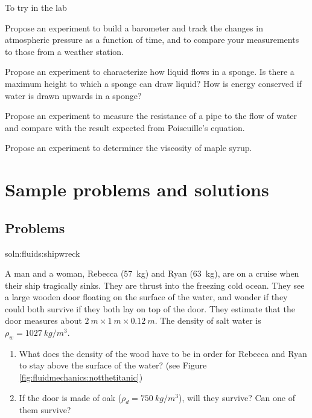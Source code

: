 {{\begin{chapteractivity}{To try in the lab}
{
\item Propose an experiment to build a barometer and track the changes in atmospheric pressure as a function of time, and to compare your measurements to those from a weather station. 
\item Propose an experiment to characterize how liquid flows in a sponge. Is there a maximum height to which a sponge can draw liquid? How is energy conserved if water is drawn upwards in a sponge?
\item Propose an experiment to measure the resistance of a pipe to the flow of water and compare with the result expected from Poiseuille's equation.
\item Propose an experiment to determiner the viscosity of maple syrup.
}
\end{chapteractivity}

\newpage
\section{Sample problems and solutions}
\subsection{Problems}
\begin{problem}{soln:fluids:shipwreck}{\label{prob:fluids:shipwreck}A man and a woman, Rebecca (\SI{57}{kg}) and Ryan (\SI{63}{kg}), are on a cruise when their ship tragically sinks. They are thrust into the freezing cold ocean. They see a large wooden door floating on the surface of the water, and wonder if they could both survive if they both lay on top of the door. They estimate that the door measures about $\SI{2}{m}\times\SI{1}{m}\times\SI{0.12}{m}$. The density of salt water is $\rho_w=\SI{1027}{kg/m^3}$.
\begin{enumerate}[label=\alph*),topsep=-10pt]
\item What does the density of the wood have to be in order for Rebecca and Ryan to stay above the surface of the water? (see Figure \ref{fig:fluidmechanics:notthetitanic}) 
\item If the door is made of oak ($\rho_d=\SI{750}{kg/m^3}$), will they survive? Can one of them survive?
\end{enumerate}
}
\end{problem}

}}
